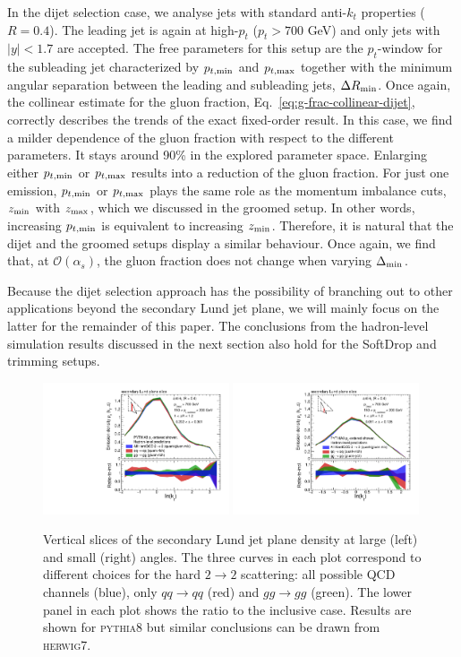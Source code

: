 \documentclass[a4paper,11pt]{article}
\newcommand{\zmin}{z_{\rm{min}}}
\newcommand{\zmax}{z_{\rm{max}}}
\newcommand{\ptmin}{p_{t,\rm{min}}}
\newcommand{\ptmax}{p_{t,\rm{max}}}
\newcommand{\py}{{\textsc{pythia}}8\xspace}
\newcommand{\hw}{{\textsc{herwig}}7\xspace}
\begin{document}
In the dijet selection case, we analyse jets with standard anti-$k_t$ properties ($R=0.4$). The leading jet is again at high-$p_t$ ($p_t> 700$ GeV) and only jets with $|y|<1.7$ are accepted. The free parameters for this setup are the $p_t$-window for the subleading jet characterized by $\ptmin$ and $\ptmax$ together with the minimum angular separation between the leading and subleading jets, $\Delta R_{\rm min}$. Once again, the collinear estimate for the gluon fraction,  Eq.~\eqref{eq:g-frac-collinear-dijet}, correctly describes the trends of the exact fixed-order result. In this case, we find a milder dependence of the gluon fraction with respect to the different parameters. It stays around 90\% in the explored parameter space. Enlarging either $\ptmin$ or $\ptmax$ results into a reduction of the gluon fraction. For just one emission, $\ptmin$ or $\ptmax$ plays the same role as the momentum imbalance cuts, $\zmin$ with $\zmax$, which we discussed in the groomed setup. In other words, increasing $\ptmin$ is equivalent to increasing $\zmin$. Therefore, it is natural that the dijet and the groomed setups display a similar behaviour. Once again, we find that, at $\mathcal{O}(\alpha_s)$, the gluon fraction does not change when varying $\Delta_{\rm min}$.  

Because the dijet selection approach has the possibility of branching out to other applications beyond the secondary Lund jet plane, we will mainly focus on the latter for the remainder of this paper. The conclusions from the hadron-level simulation results discussed in the next section also hold for the SoftDrop and trimming setups.

\begin{figure}
    \centering
    \includegraphics[width = 0.49\textwidth]{figures/Figure3a.pdf}
    \includegraphics[width = 0.49\textwidth]{figures/Figure3b.pdf}
    \caption{Vertical slices of the secondary Lund jet plane density at large (left) and small (right) angles. The three curves in each plot correspond to different choices for the hard $2\to 2$ scattering: all possible QCD channels (blue), only $qq\to qq$ (red) and $gg \to gg$ (green). The lower panel in each plot shows the ratio to the inclusive case. Results are shown for \py but similar conclusions can be drawn from \hw.}
    \label{fig:universality}
\end{figure}
\end{document}
